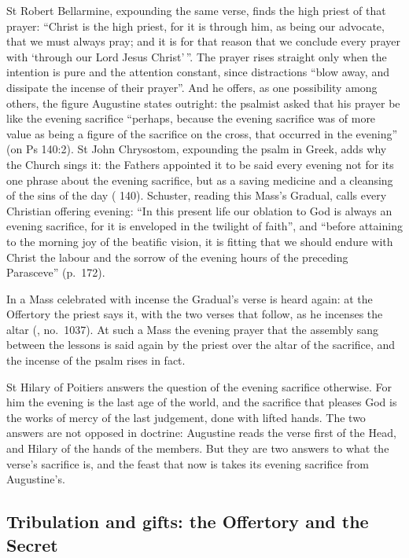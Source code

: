 St Robert Bellarmine, expounding the same verse, finds the high priest of that
prayer: ``Christ is the high priest, for it is through him, as being our
advocate, that we must always pray; and it is for that reason that we conclude
every prayer with `through our Lord Jesus Christ'\,''. The prayer rises
straight only when the intention is pure and the attention constant, since
distractions ``blow away, and dissipate the incense of their prayer''. And he
offers, as one possibility among others, the figure Augustine states outright:
the psalmist asked that his prayer be like the evening sacrifice ``perhaps,
because the evening sacrifice was of more value as being a figure of the
sacrifice on the cross, that occurred in the evening'' (on Ps 140:2). St John
Chrysostom, expounding the psalm in Greek, adds why the Church sings it: the
Fathers appointed it to be said every evening not for its one phrase about the
evening sacrifice, but as a saving medicine and a cleansing of the sins of the
day ( 140). Schuster, reading this Mass's Gradual,
calls every Christian offering evening: ``In this present life our oblation to
God is always an evening sacrifice, for it is enveloped in the twilight of
faith'', and ``before attaining to the morning joy of the beatific vision, it
is fitting that we should endure with Christ the labour and the sorrow of the
evening hours of the preceding Parasceve'' (p.~172).

In a Mass celebrated with incense the Gradual's verse is heard again: at the
Offertory the priest says it, with the two verses that follow, as he incenses
the altar (, no.~1037). At such a Mass the evening prayer
that the assembly sang between the lessons is said again by the priest over the
altar of the sacrifice, and the incense of the psalm rises in fact.

St Hilary of Poitiers answers the question of the evening sacrifice otherwise. For him
the evening is the last age of the world, and the sacrifice that pleases God is
the works of mercy of the last judgement, done with lifted hands. The two
answers are not opposed in doctrine: Augustine reads the verse first of the
Head, and Hilary of the hands of the members. But they are two answers to what
the verse's sacrifice is, and the feast that now is takes its evening
sacrifice from Augustine's.

\subsection{Tribulation and gifts: the Offertory and the Secret}

